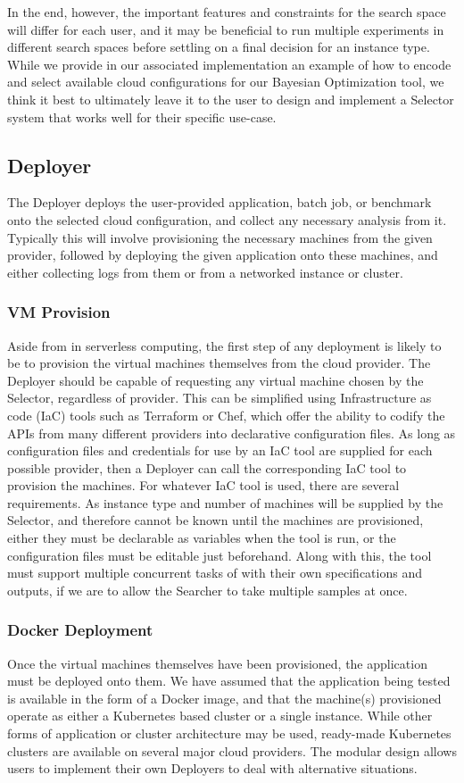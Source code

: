 \documentclass{article}
\begin{document}
In the end,  however, the important features and constraints for the search space will differ for each user, and it may be beneficial to run multiple experiments in different search spaces before settling on a final decision for an instance type. While we provide in our associated implementation an example of how to encode and select available cloud configurations for our Bayesian Optimization tool, we think it best to ultimately leave it to the user to design and implement a Selector system that works well for their specific use-case.


\subsection{Deployer}
The Deployer deploys the user-provided application, batch job, or benchmark onto the selected cloud configuration, and collect any necessary analysis from it. Typically this will involve provisioning the necessary machines from the given provider, followed by deploying the given application onto these machines, and either collecting logs from them or from a networked instance or cluster. 

\subsubsection{VM Provision}
Aside from in serverless computing, the first step of any deployment is likely to be to provision the virtual machines themselves from the cloud provider. The Deployer should be capable of requesting any virtual machine chosen by the Selector, regardless of provider. This can be simplified using Infrastructure as code (IaC) tools such as Terraform or Chef, which offer the ability to codify the APIs from many different providers into declarative configuration files. As long as configuration files and credentials for use by an IaC tool are supplied for each possible provider, then a Deployer can call the corresponding IaC tool to provision the machines. 
For whatever IaC tool is used, there are several requirements. As instance type and number of machines will be supplied by the Selector, and therefore cannot be known until the machines are provisioned, either they must be declarable as variables when the tool is run, or the configuration files must be editable just beforehand. Along with this, the tool must support multiple concurrent tasks of with their own specifications and outputs, if we are to allow the Searcher to take multiple samples at once.

\subsubsection{Docker Deployment}
Once the virtual machines themselves have been provisioned, the application must be deployed onto them. We have assumed that the application being tested is available in the form of a Docker image, and that the machine(s) provisioned operate as either a Kubernetes based cluster or a single instance. While other forms of application or cluster architecture may be used, ready-made Kubernetes clusters are available on several major cloud providers. The modular design allows users to implement their own Deployers to deal with alternative situations. 
\end{document}
